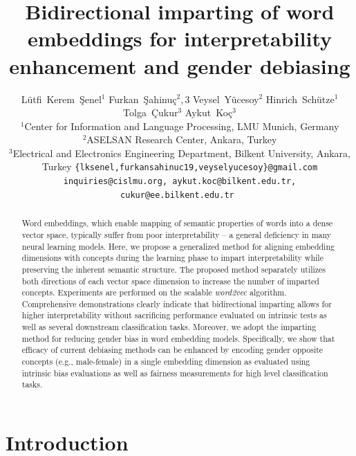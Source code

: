 \documentclass[11pt,a4paper]{article}
\title{Bidirectional imparting of word embeddings for interpretability enhancement and gender debiasing}
\author{Lütfi~Kerem~Şenel$^1$ \And Furkan~Şahinuç$^2,3$ \And Veysel~Yücesoy$^2$ \And Hinrich~Schütze$^1$ \And Tolga~Çukur$^3$ \And Aykut~Koç$^3$\\
  $^1$Center for Information and Language Processing, LMU Munich, Germany \\
  $^2$ASELSAN Research Center, Ankara, Turkey \\
  $^3$Electrical and Electronics Engineering Department, Bilkent University, Ankara, Turkey
  \texttt{\{lksenel,furkansahinuc19,veyselyucesoy\}@gmail.com}\\
  \texttt{inquiries@cislmu.org, aykut.koc@bilkent.edu.tr, cukur@ee.bilkent.edu.tr } \\}
\date{}
\begin{document}
\maketitle
\begin{abstract}
Word embeddings, which enable mapping of semantic properties of words into a dense vector space, typically suffer from poor interpretability -- a general deficiency in many neural learning models. 
Here, we propose a generalized method for aligning embedding dimensions with concepts during the learning phase to impart interpretability while preserving the inherent semantic structure. 
The proposed method separately utilizes both directions of each vector space dimension to increase the number of imparted concepts.
Experiments are performed on the scalable \textit{word2vec} algorithm.
Comprehensive demonstrations clearly indicate that bidirectional imparting allows for higher interpretability without sacrificing performance evaluated on intrinsic tests as well as several downstream classification tasks.
Moreover, we adopt the imparting method for reducing gender bias in word embedding models. Specifically, we show that efficacy of current debiasing methods can be enhanced by encoding gender opposite concepts (e.g., male-female) in a single embedding dimension as evaluated using intrinsic bias evaluations as well as fairness measurements for high level classification tasks.
\end{abstract}

\section{Introduction}\label{sec:intro}
\end{document}
